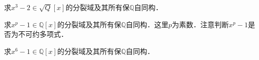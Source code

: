 \begin{exercise}{}
求$x^3-2\in\sqrt{Q}[x]$的分裂域及其所有保$\mathbb{Q}$自同构．
\end{exercise}



\begin{exercise}{}
求$x^p-1\in\mathbb{Q}[x]$的分裂域及其所有保$\mathbb{Q}$自同构．这里$p$为素数．注意判断$x^p-1$是否为不可约多项式．
\end{exercise}


\begin{exercise}{}
求$x^6-1\in\mathbb{Q}[x]$的分裂域及其所有保$\mathbb{Q}$自同构．
\end{exercise}














